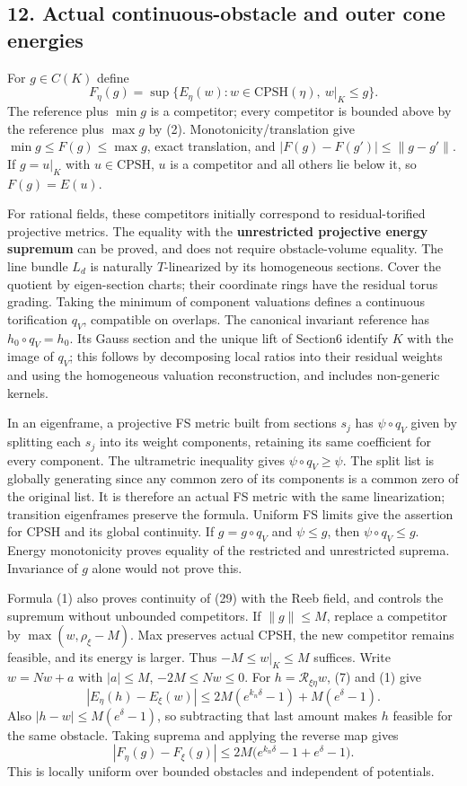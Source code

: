 \documentclass[
  11pt,
]{article}
\begin{document}
\subsection{12. Actual continuous-obstacle and outer cone
energies}\label{actual-continuous-obstacle-and-outer-cone-energies}

For \(g\in C(K)\) define
\[ F_\eta(g)=\sup\{E_\eta(w):w\in\mathrm{CPSH}(\eta),\ w|_K\leq g\}.     \tag{29}\]
The reference plus \(\min g\) is a competitor; every competitor is
bounded above by the reference plus \(\max g\) by (2).
Monotonicity/translation give \(\min g\leq F(g)\leq\max g\), exact
translation, and \(|F(g)-F(g')|\leq\|g-g'\|\). If \(g=u|_K\) with
\(u\in\mathrm{CPSH}\), \(u\) is a competitor and all others lie below
it, so \(F(g)=E(u)\).

For rational fields, these competitors initially correspond to
residual-torified projective metrics. The equality with the
\textbf{unrestricted projective energy supremum} can be proved, and does
not require obstacle-volume equality. The line bundle \(L_d\) is
naturally \(T\)-linearized by its homogeneous sections. Cover the
quotient by eigen-section charts; their coordinate rings have the
residual torus grading. Taking the minimum of component valuations
defines a continuous torification \(q_V\), compatible on overlaps. The
canonical invariant reference has \(h_0\circ q_V=h_0\). Its Gauss
section and the unique lift of Section6 identify \(K\) with the image of
\(q_V\); this follows by decomposing local ratios into their residual
weights and using the homogeneous valuation reconstruction, and includes
non-generic kernels.

In an eigenframe, a projective FS metric built from sections \(s_j\) has
\(\psi\circ q_V\) given by splitting each \(s_j\) into its weight
components, retaining its same coefficient for every component. The
ultrametric inequality gives \(\psi\circ q_V\geq\psi\). The split list
is globally generating since any common zero of its components is a
common zero of the original list. It is therefore an actual FS metric
with the same linearization; transition eigenframes preserve the
formula. Uniform FS limits give the assertion for CPSH and its global
continuity. If \(g=g\circ q_V\) and \(\psi\leq g\), then
\(\psi\circ q_V\leq g\). Energy monotonicity proves equality of the
restricted and unrestricted suprema. Invariance of \(g\) alone would not
prove this.

Formula (1) also proves continuity of (29) with the Reeb field, and
controls the supremum without unbounded competitors. If \(\|g\|\leq M\),
replace a competitor by \(\max(w,\rho_\xi-M)\). Max preserves actual
CPSH, the new competitor remains feasible, and its energy is larger.
Thus \(-M\leq w|_K\leq M\) suffices. Write \(w=Nw+a\) with
\(|a|\leq M\), \(-2M\leq Nw\leq0\). For \(h=\mathcal R_{\xi\eta}w\), (7)
and (1) give
\[ |E_\eta(h)-E_\xi(w)|\leq2M(e^{k_n\delta}-1)+M(e^\delta-1).\] Also
\(|h-w|\leq M(e^\delta-1)\), so subtracting that last amount makes \(h\)
feasible for the same obstacle. Taking suprema and applying the reverse
map gives \[ |F_\eta(g)-F_\xi(g)|\leq
       2M\big(e^{k_n\delta}-1+e^\delta-1\big).                          \tag{30}\]
This is locally uniform over bounded obstacles and independent of
potentials.
\end{document}
